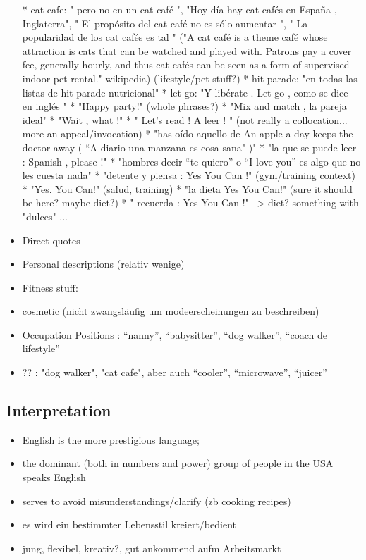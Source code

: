 \begin{itemize}
    * cat cafe: " pero no en un cat café ", "Hoy día hay cat cafés en España , Inglaterra", " El propósito del cat café no es sólo aumentar ", " La popularidad de los cat cafés es tal "  ("A cat café is a theme café whose attraction is cats that can be watched and played with. Patrons pay a cover fee, generally hourly, and thus cat cafés can be seen as a form of supervised indoor pet rental." wikipedia) (lifestyle/pet stuff?)
    * hit parade: "en todas las listas de hit parade nutricional"
    * let go: "Y libérate . Let go , como se dice en inglés "
    * "Happy party!" (whole phrases?)
    * "Mix and match , la pareja ideal"
    * "Wait , what !"
    * " Let’s read ! A leer ! " (not really a collocation... more an appeal/invocation)
    * "has oído aquello de An apple a day keeps the doctor away ( “A diario una manzana es cosa sana" )"
    * "la que se puede leer : Spanish , please !"
    * "hombres decir “te quiero” o “I love you” es algo que no les cuesta nada"
    * "detente y piensa : Yes You Can !" (gym/training context)
    * "Yes. You Can!" (salud, training)
    * "la dieta Yes You Can!" (sure it should be here? maybe diet?)
    * " recuerda : Yes You Can !" --> diet? something with "dulces" ...
  \item Direct quotes
  \item Personal descriptions (relativ wenige)
  \item Fitness stuff:
  \item cosmetic (nicht zwangsläufig um modeerscheinungen zu beschreiben)
  \item Occupation Positions : ``nanny'', ``babysitter'', ``dog walker'', ``coach de lifestyle''
  \item ?? : "dog walker", "cat cafe", aber auch ``cooler'', ``microwave'', ``juicer''


\end{itemize}



\subsection{Interpretation}

\begin{itemize}
  \item English is the more prestigious language;
  \item the dominant (both in numbers and power) group of people in the USA speaks English
  \item serves to avoid misunderstandings/clarify (zb cooking recipes)
  \item es wird ein bestimmter Lebensstil kreiert/bedient
  \item jung, flexibel, kreativ?, gut ankommend aufm Arbeitsmarkt
\end{itemize}


